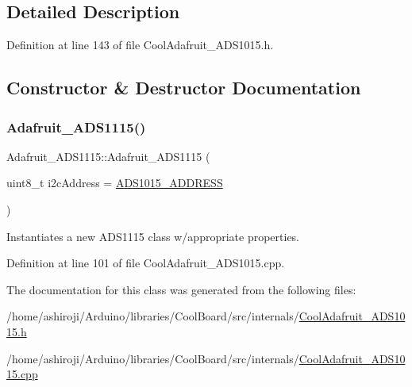 \subsection{Detailed Description}


Definition at line 143 of file Cool\+Adafruit\+\_\+\+A\+D\+S1015.\+h.



\subsection{Constructor \& Destructor Documentation}
\mbox{\label{class_adafruit___a_d_s1115_a7058cf2c75b673fb0b0a8936c3edd1fd}} 
\subsubsection{\texorpdfstring{Adafruit\+\_\+\+A\+D\+S1115()}{Adafruit\_ADS1115()}}
{\footnotesize\ttfamily Adafruit\+\_\+\+A\+D\+S1115\+::\+Adafruit\+\_\+\+A\+D\+S1115 (\begin{DoxyParamCaption}\item[{uint8\+\_\+t}]{i2c\+Address = {\ttfamily \hyperlink{_cool_adafruit___a_d_s1015_8h_ae55d158023984e8f0ddc80b58d5b30dc}{A\+D\+S1015\+\_\+\+A\+D\+D\+R\+E\+SS}} }\end{DoxyParamCaption})}



Instantiates a new A\+D\+S1115 class w/appropriate properties. 



Definition at line 101 of file Cool\+Adafruit\+\_\+\+A\+D\+S1015.\+cpp.



The documentation for this class was generated from the following files\+:\begin{DoxyCompactItemize}
\item 
/home/ashiroji/\+Arduino/libraries/\+Cool\+Board/src/internals/\hyperlink{_cool_adafruit___a_d_s1015_8h}{Cool\+Adafruit\+\_\+\+A\+D\+S1015.\+h}\item 
/home/ashiroji/\+Arduino/libraries/\+Cool\+Board/src/internals/\hyperlink{_cool_adafruit___a_d_s1015_8cpp}{Cool\+Adafruit\+\_\+\+A\+D\+S1015.\+cpp}\end{DoxyCompactItemize}
